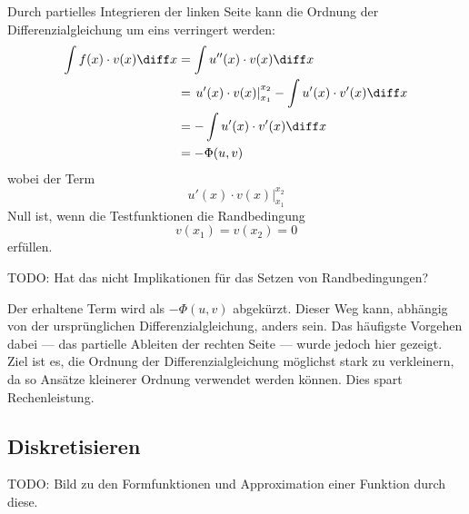 Durch partielles Integrieren der linken Seite kann die Ordnung der Differenzialgleichung um eins verringert werden:
\begin{align}
    \int f(x) \cdot v(x) \diff x &= \int u''(x) \cdot v(x) \diff x \\
                                 &= \left. u'(x) \cdot v(x) \right|_{x_1}^{x_2} - \int u'(x) \cdot v'(x) \diff x \\
                                 &= - \int u'(x) \cdot v'(x) \diff x \\
                                 &= - \Phi(u, v)
\end{align}
wobei der Term
\begin{equation}
    \left. u'(x) \cdot v(x) \right|_{x_1}^{x_2}
\end{equation}
Null ist, wenn die Testfunktionen die Randbedingung
\begin{equation}
    v(x_1) = v(x_2) = 0
\end{equation}
erfüllen. 

TODO: Hat das nicht Implikationen für das Setzen von Randbedingungen?

Der erhaltene Term wird als $-\Phi(u, v)$ abgekürzt.
Dieser Weg kann, abhängig von der ursprünglichen Differenzialgleichung, anders sein.
Das häufigste Vorgehen dabei --- das partielle Ableiten der rechten Seite --- wurde jedoch hier gezeigt.
Ziel ist es, die Ordnung der Differenzialgleichung möglichst stark zu verkleinern, da so Ansätze kleinerer Ordnung verwendet werden können.
Dies spart Rechenleistung.


\subsection{Diskretisieren\label{fem:1d:diskretisieren}}
TODO: Bild zu den Formfunktionen und Approximation einer Funktion durch diese. 

